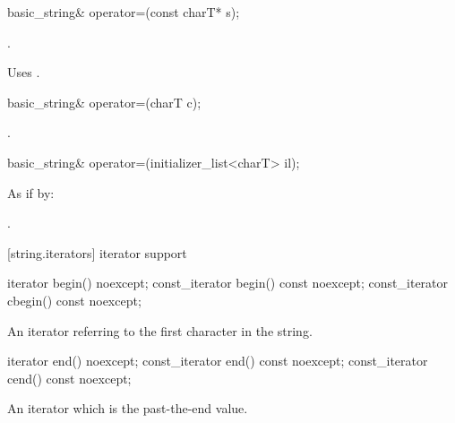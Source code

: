 %
\begin{itemdecl}
basic_string& operator=(const charT* s);
\end{itemdecl}

\begin{itemdescr}
\pnum
\returns
{}.

\pnum
\remarks
Uses
%
.
\end{itemdescr}

%
\begin{itemdecl}
basic_string& operator=(charT c);
\end{itemdecl}

\begin{itemdescr}
\pnum
\returns
{}.
\end{itemdescr}

%
\begin{itemdecl}
basic_string& operator=(initializer_list<charT> il);
\end{itemdecl}

\begin{itemdescr}
\pnum
\effects As if by: 

\pnum
\returns {}.
\end{itemdescr}

[string.iterators]{ iterator support}

%
%
\begin{itemdecl}
iterator       begin() noexcept;
const_iterator begin() const noexcept;
const_iterator cbegin() const noexcept;
\end{itemdecl}

\begin{itemdescr}
\pnum
\returns
An iterator referring to the first character in the string.
\end{itemdescr}

%
%
\begin{itemdecl}
iterator       end() noexcept;
const_iterator end() const noexcept;
const_iterator cend() const noexcept;
\end{itemdecl}

\begin{itemdescr}
\pnum
\returns
An iterator which is the past-the-end value.
\end{itemdescr}

